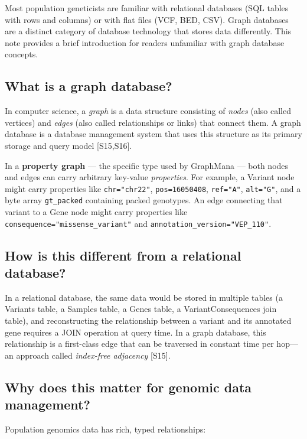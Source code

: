 \documentclass[11pt,a4paper]{article}
\begin{document}
Most population geneticists are familiar with relational databases (SQL tables with rows and columns) or with flat files (VCF, BED, CSV). Graph databases are a distinct category of database technology that stores data differently. This note provides a brief introduction for readers unfamiliar with graph database concepts.

\subsection*{What is a graph database?}

In computer science, a \textit{graph} is a data structure consisting of \textit{nodes} (also called vertices) and \textit{edges} (also called relationships or links) that connect them. A graph database is a database management system that uses this structure as its primary storage and query model [S15,S16].

In a \textbf{property graph} --- the specific type used by GraphMana --- both nodes and edges can carry arbitrary key-value \textit{properties}. For example, a Variant node might carry properties like \texttt{chr="chr22"}, \texttt{pos=16050408}, \texttt{ref="A"}, \texttt{alt="G"}, and a byte array \texttt{gt\_packed} containing packed genotypes. An edge connecting that variant to a Gene node might carry properties like \texttt{consequence="missense\_variant"} and \texttt{annotation\_version="VEP\_110"}.

\subsection*{How is this different from a relational database?}

In a relational database, the same data would be stored in multiple tables (a Variants table, a Samples table, a Genes table, a VariantConsequences join table), and reconstructing the relationship between a variant and its annotated gene requires a JOIN operation at query time. In a graph database, this relationship is a first-class edge that can be traversed in constant time per hop---an approach called \textit{index-free adjacency} [S15].

\subsection*{Why does this matter for genomic data management?}

Population genomics data has rich, typed relationships:
\end{document}
